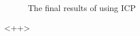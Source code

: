 \begin{figure}[ht]
	\centering
	 \quad
	\caption{The final results of using ICP}
	\label{fig:<+label+>}
\end{figure}<++>
